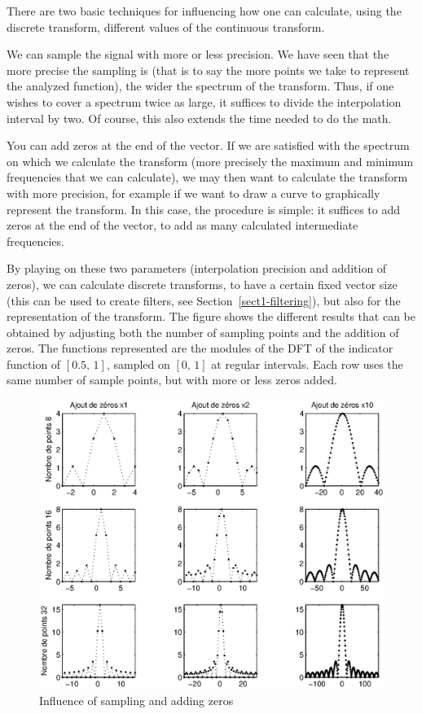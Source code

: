  There are two basic techniques for influencing how one can calculate, using the discrete transform, different values of the continuous transform. \begin{rs}
\item {} We can sample the signal with more or less precision. We have seen that the more precise the sampling is (that is to say the more points we take to represent the analyzed function), the wider the spectrum of the transform. Thus, if one wishes to cover a spectrum twice as large, it suffices to divide the interpolation interval by two. Of course, this also extends the time needed to do the math.
\item You can add zeros at the end of the vector. If we are satisfied with the spectrum on which we calculate the transform (more precisely the maximum and minimum frequencies that we can calculate), we may then want to calculate the transform with more precision, for example if we want to draw a curve to graphically represent the transform. In this case, the procedure is simple: it suffices to add zeros at the end of the vector, to add as many calculated intermediate frequencies.
\end{rs} By playing on these two parameters (interpolation precision and addition of zeros), we can calculate  discrete transforms, to have a certain fixed vector size (this can be used to create filters, see Section~\ref{sect1-filtering}), but also for the representation of the transform. The figure  shows the different results that can be obtained by adjusting both the number of sampling points and the addition of zeros. The functions represented are the modules of the DFT of the indicator function of $ [0.5, \, 1] $, sampled on $ [0, \, 1] $ at regular intervals. Each row uses the same number of sample points, but with more or less zeros added. \begin{figure}[ht]
    \begin{center}
    \includegraphics[scale=0.7]{images/calcul-approche-tf.eps}
    \end{center}
    \caption{Influence of sampling and adding zeros}
              \label{fig-calcul-approach-tf}
\end{figure}
